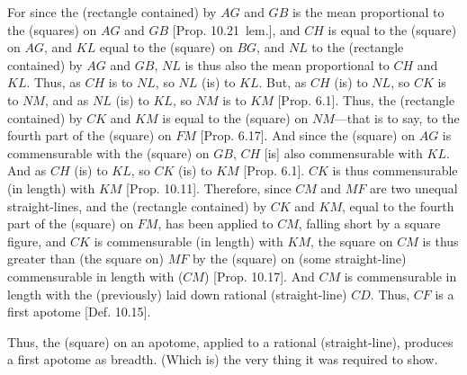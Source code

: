 \begin{Parallel}{}{}
{For since the (rectangle contained) by $AG$ and $GB$ is the
mean proportional to the (squares) on $AG$ and $GB$ [Prop. 10.21~lem.], and $CH$ is equal
to the (square) on $AG$, and $KL$ equal to the (square) on 
$BG$, and $NL$ to the (rectangle contained) by $AG$ and $GB$,
$NL$ is thus also the mean proportional to $CH$ and $KL$. Thus,
as $CH$ is to $NL$, so $NL$ (is) to $KL$. But, as $CH$ (is) to
$NL$, so $CK$ is to $NM$, and as $NL$ (is) to $KL$, so
$NM$ is to $KM$ [Prop. 6.1]. 
Thus, the (rectangle contained) by $CK$ and $KM$
is equal to the (square) on $NM$---that is to say, to the fourth
part of the (square) on $FM$ [Prop. 6.17]. 
And since the (square) on $AG$ is commensurable with the
(square) on $GB$, $CH$ [is] also commensurable with
$KL$. And as $CH$ (is) to $KL$, so $CK$ (is) to $KM$ [Prop. 6.1]. $CK$ is thus
commensurable (in length) with $KM$ [Prop. 10.11].  Therefore, since $CM$ and
$MF$ are two unequal straight-lines, and the (rectangle
contained) by $CK$ and $KM$, equal to the fourth part of the
(square) on $FM$, has been applied to $CM$, falling short by a square figure, and $CK$ is commensurable
(in length) with $KM$,  the square on $CM$ is thus greater than
(the square on) $MF$ by the (square) on (some straight-line)
commensurable in length with ($CM$) [Prop. 10.17]. 
And $CM$ is commensurable in length with the (previously) laid down rational (straight-line) $CD$. Thus, $CF$ is a first apotome [Def. 10.15].

Thus, the (square) on an apotome, applied to a rational (straight-line),
produces  a first apotome as breadth. (Which is) the very thing it was required to show.}
\end{Parallel}

